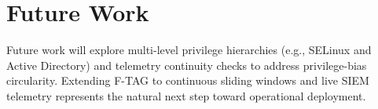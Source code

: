 \documentclass[12pt]{article}
\begin{document}
\section{Future Work}\label{sec:future-work}
Future work will explore multi-level privilege hierarchies (e.g., SELinux and Active Directory) and telemetry continuity checks to address privilege-bias circularity. Extending F-TAG to continuous sliding windows and live SIEM telemetry represents the natural next step toward operational deployment.



\end{document}
